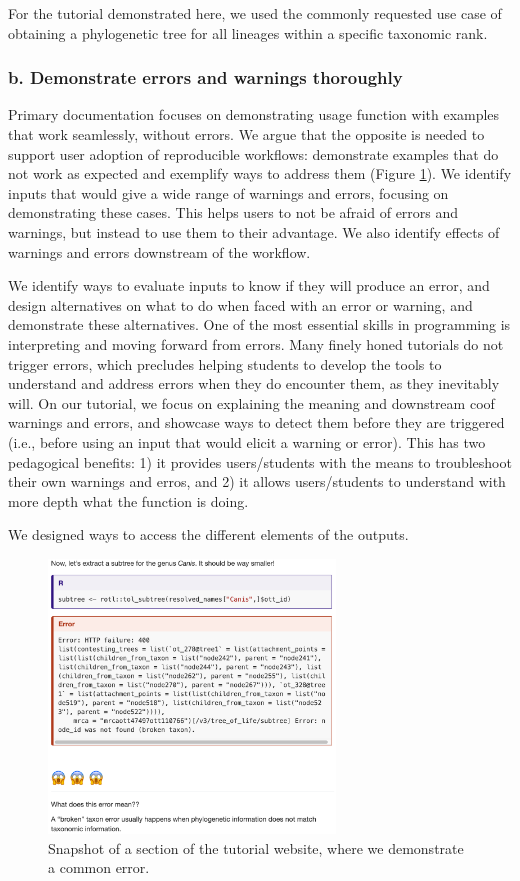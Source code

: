 \documentclass[12pt]{article}
\begin{document}
For the tutorial demonstrated here, we used the commonly requested use case of obtaining
a phylogenetic tree for all lineages within a specific taxonomic rank.

\subsubsection*{b. Demonstrate errors and warnings thoroughly}

Primary documentation focuses on demonstrating usage function with examples that
work seamlessly, without errors. We argue that the opposite is needed to support
user adoption of reproducible workflows: demonstrate examples that do not work
as expected and exemplify ways to address them (Figure \ref{fig:first}).
We identify inputs that would give
a wide range of warnings and errors, focusing on demonstrating these cases. This
helps users to not be afraid of errors and warnings, but instead to use them to
their advantage.
We also identify effects of warnings and errors downstream of the workflow.

We identify ways to evaluate inputs to know if they will produce an error, and design
alternatives on what to do when faced with an error or warning, and demonstrate
these alternatives.
One of the most essential skills in programming is interpreting and moving forward
from errors.
Many finely honed tutorials do not trigger errors, which precludes helping students
to develop the tools to understand and address errors when they do encounter them,
as they inevitably will.
On our tutorial, we focus on explaining the meaning and downstream coof warnings and errors, and
 showcase ways to detect them before they are triggered (i.e., before using an input
  that would elicit a warning or error). This has two pedagogical benefits:
1) it provides users/students with the means to troubleshoot their own warnings and erros, and
2) it allows users/students to understand with more depth what the function is doing.

We designed ways to access the different elements of the outputs.

\begin{figure}
\begin{center}
\includegraphics[width=3in]{fig1.png}
\end{center}
\caption{Snapshot of a section of the tutorial website, where we demonstrate a common error. \label{fig:first}}
\end{figure}
\end{document}
